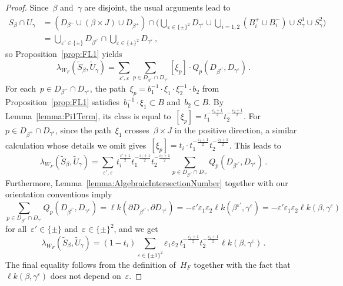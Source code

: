 \documentclass[10.9pt,a4paper]{amsart}
\theoremstyle{definition}
\theoremstyle{remark}
\newcommand{\lk}{\ell k}
\begin{document}
\begin{proof}
Since~$\beta$ and~$\gamma$ are disjoint, the usual arguments lead to
\begin{align*}
S_\beta \cap U_{\gamma} &= (D_{\beta^-} \cup (\beta \times J) \cup D_{\beta^+}) \cap \Big( \bigcup_{\varepsilon \in \{\pm\}^2} D_{\gamma^{\varepsilon}} \cup \bigcup _{i=1,2} \left(B_i^+ \cup B_i^-\right) \cup S_{\gamma}^1 \cup S_{\gamma}^2 \Big)\\
	&=\bigcup_{\varepsilon'\in\{\pm\}}D_{\beta^{\varepsilon'}}\cap\bigcup_{\varepsilon\in \{\pm\}^2} D_{\gamma^{\varepsilon}}\,,
\end{align*}
so Proposition~\ref{prop:FL1} yields
\[
\lambda_{W_F}(\tilde S_{\beta},\tilde U_{\gamma} ) = \sum_{\varepsilon',\varepsilon} \sum_{p\in D_{\beta^{\varepsilon'}} \cap D_{\gamma^\varepsilon}} [\xi_p]\cdot Q_p(D_{\beta^{\varepsilon'}}, D_{\gamma^\varepsilon})\,.
\]
For each~$p \in D_{\beta^-} \cap D_{\gamma^\varepsilon}$, the path~$\xi_p=b_1^{-1}\cdot\xi_1\cdot\xi^{-1}_2\cdot b_2$ from Proposition~\ref{prop:FL1} satisfies~$b_1^{-1}\cdot\xi_1\subset B$ and~$b_2\subset B$. 
By Lemma~\ref{lemma:Pi1Term}, its class is equal to~$[\xi_p] = t_1^{-\frac{\varepsilon_1 + 1}{2}} t_2^{-\frac{\varepsilon_2 + 1}{2}}$. 
For~$p \in D_{\beta^+} \cap D_{\gamma^\varepsilon}$, since the path~$\xi_1$ crosses~$ \beta \times J$ in the positive direction, 
a similar calculation whose details we omit gives~$[\xi_p]=t_i \cdot t_1^{-\frac{\varepsilon_1 + 1}{2}} t_2^{-\frac{\varepsilon_2 + 1}{2}}$.
This leads to
\[
\lambda_{W_F}(\tilde S_{\beta},\tilde U_{\gamma} ) = \sum_{\varepsilon',\varepsilon} \,t_i^{\frac{\varepsilon'+1}{2}} t_1^{-\frac{\varepsilon_1 + 1}{2}} t_2^{-\frac{\varepsilon_2 + 1}{2}}\sum_{p\in D_{\beta^{\varepsilon'}} \cap D_{\gamma^\varepsilon}} Q_p(D_{\beta^{\varepsilon'}}, D_{\gamma^\varepsilon})\,.
\]
Furthermore, Lemma~\ref{lemma:AlgebraicIntersectionNumber} together with our orientation conventions imply
\[
\sum_{p\in D_{\beta^{\varepsilon'}} \cap D_{\gamma^\varepsilon}} Q_p(D_{\beta^{\varepsilon'}}, D_{\gamma^\varepsilon})
=\lk(\partial D_{\beta^{\varepsilon'}},\partial D_{\gamma^\varepsilon})
= -\varepsilon'\varepsilon_1\varepsilon_2\lk(\beta^{\varepsilon'}, \gamma^\varepsilon)
= -\varepsilon'\varepsilon_1\varepsilon_2\lk(\beta, \gamma^\varepsilon)
\]
for all~$\varepsilon'\in\{\pm\}$ and~$\varepsilon\in\{\pm\}^2$,
and we get
\[
\lambda_{W_F}(\tilde S_{\beta},\tilde U_{\gamma}) = (1-t_{i}) \sum_{\varepsilon \in \{\pm1\}^2} \varepsilon_1\varepsilon_2 \, t_1^{-\frac{\varepsilon_1 + 1}{2}} t_2^{-\frac{\varepsilon_2 + 1}{2}}  \lk(\beta, \gamma^\varepsilon)\,.
\]
The final equality follows from the definition of~$H_F$ together with the fact that~$\lk(\beta, \gamma^\varepsilon)$ does not depend on~$\varepsilon$.
\end{proof}
\end{document}

